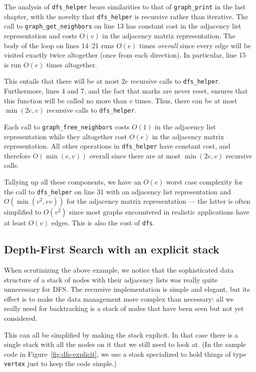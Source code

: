 The analysis of \lstinline'dfs_helper' bears similarities to that of
\lstinline'graph_print' in the last chapter, with the novelty that
\lstinline'dfs_helper' is recursive rather than iterative.  The call
to \lstinline'graph_get_neighbors' on line 13 has
constant cost in the adjacency list representation and costs $O(v)$ in
the adjacency matrix representation.  The body of the loop on
lines 14--21 runs $O(e)$ times
\emph{overall} since every edge will be visited exactly twice
altogether (once from each direction).  In particular,
line 15 is run $O(e)$ times altogether.

This entails that there will be at most $2e$ recursive calls to
\lstinline'dfs_helper'.  Furthermore, lines 4 and 7,
and the fact that marks are never reset,
ensures that this function will be called no more than $v$ times.
Thus, there can be at most $\min(2e, v)$ recursive calls to
\lstinline'dfs_helper'.

Each call to \lstinline'graph_free_neighbors' costs $O(1)$ in the
adjacency list representation while they altogether cost $O(e)$ in the
adjacency matrix representation.  All other operations in
\lstinline'dfs_helper' have constant cost, and therefore
$O(\min(e,v))$ overall since there are at most $\min(2e,v)$ recursive
calls.

Tallying up all these components, we have an $O(e)$ worst case
complexity for the call to \lstinline'dfs_helper' on
line 31 with an adjacency list representation and
$O(\min(v^2,ev))$ for the adjacency matrix representation --- the
latter is often simplified to $O(v^2)$ since most graphs encountered
in realistic applications have at least $O(v)$ edges.  This is also
the cost of \lstinline'dfs'.


\subsection{Depth-First Search with an explicit stack}
\label{sec:graphsearch:dfs_iterative}

When scrutinizing the above example, we notice that the sophisticated
data structure of a stack of nodes with their adjacency lists was
really quite unnecessary for DFS.  The recursive implementation is
simple and elegant, but its effect is to make the data management more
complex than necessary: all we really need for backtracking is a stack
of nodes that have been seen but not yet considered.

This can all be simplified by making the stack explicit. In that case
there is a single stack with all the nodes on it that we still need to
look at. (In the sample code in Figure~\ref{fig:dfs-explicit}, we use
a stack specialized to hold things of type \lstinline'vertex' just to
keep the code simple.)

